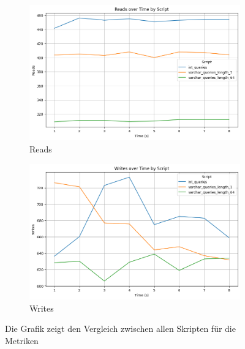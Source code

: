 \begin{figure}[H]
    \centering
    \begin{subfigure}[t]{0.48\textwidth}
        \centering
        \includegraphics[width=\textwidth]{PNGs/Script/Join_Typ/join-type/Reads}
        \caption{Reads}
        \label{join-typ-reads}
    \end{subfigure}
    \hfill
    \begin{subfigure}[t]{0.48\textwidth}
        \centering
        \includegraphics[width=\textwidth]{PNGs/Script/Join_Typ/join-type/Writes}
        \caption{Writes}
        \label{join-typ-writes}
    \end{subfigure}
    \caption[Join-Typ: Metrikvergleich]{Die Grafik zeigt den Vergleich zwischen allen Skripten für die Metriken}
    \label{fig:join-typ-comp-metric}
\end{figure}
\vspace{-20pt}

